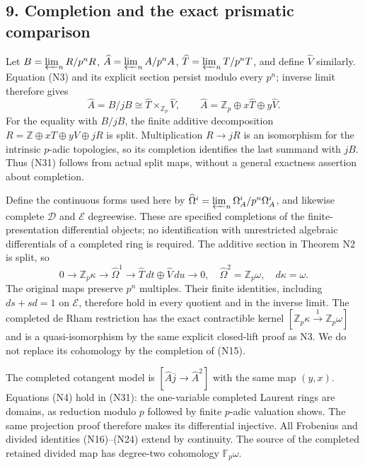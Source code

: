 \documentclass[
]{article}
\begin{document}
\subsection{9. Completion and the exact prismatic
comparison}\label{completion-and-the-exact-prismatic-comparison}

Let \(B=\varprojlim_nR/p^nR\), \(\widehat A=\varprojlim_nA/p^nA\),
\(\widehat T=\varprojlim_nT/p^nT\), and define \(\widehat V\) similarly.
Equation (N3) and its explicit section persist modulo every \(p^n\);
inverse limit therefore gives \[
\widehat A=B/jB\cong\widehat T\times_{\mathbb Z_p}\widehat V,
\qquad\widehat A=\mathbb Z_p\oplus x\widehat T\oplus y\widehat V.
\tag{N31}
\] For the equality with \(B/jB\), the finite additive decomposition
\(R=\mathbb Z\oplus xT\oplus yV\oplus jR\) is split. Multiplication
\(R\to jR\) is an isomorphism for the intrinsic \(p\)-adic topologies,
so its completion identifies the last summand with \(jB\). Thus (N31)
follows from actual split maps, without a general exactness assertion
about completion.

Define the continuous forms used here by
\(\widehat\Omega^i=\varprojlim_n\Omega^i_A/p^n\Omega^i_A\), and likewise
complete \(\mathcal D\) and \(\mathcal E\) degreewise. These are
specified completions of the finite-presentation differential objects;
no identification with unrestricted algebraic differentials of a
completed ring is required. The additive section in Theorem N2 is split,
so \[
0\longrightarrow\mathbb Z_p\kappa\longrightarrow\widehat\Omega^1
\longrightarrow\widehat T\,dt\oplus\widehat V\,du\longrightarrow0,
\quad\widehat\Omega^2=\mathbb Z_p\omega,
\quad d\kappa=\omega.
\tag{N32}
\] The original maps preserve \(p^n\) multiples. Their finite
identities, including \(ds+sd=1\) on \(\mathcal E\), therefore hold in
every quotient and in the inverse limit. The completed de Rham
restriction has the exact contractible kernel
\([\mathbb Z_p\kappa\xrightarrow{1}\mathbb Z_p\omega]\) and is a
quasi-isomorphism by the same explicit closed-lift proof as N3. We do
not replace its cohomology by the completion of (N15).

The completed cotangent model is
\([\widehat A\overline j\to\widehat A^2]\) with the same map \((y,x)\).
Equations (N4) hold in (N31): the one-variable completed Laurent rings
are domains, as reduction modulo \(p\) followed by finite \(p\)-adic
valuation shows. The same projection proof therefore makes its
differential injective. All Frobenius and divided identities
(N16)--(N24) extend by continuity. The source of the completed retained
divided map has degree-two cohomology \(\mathbb F_p\omega\).
\end{document}
